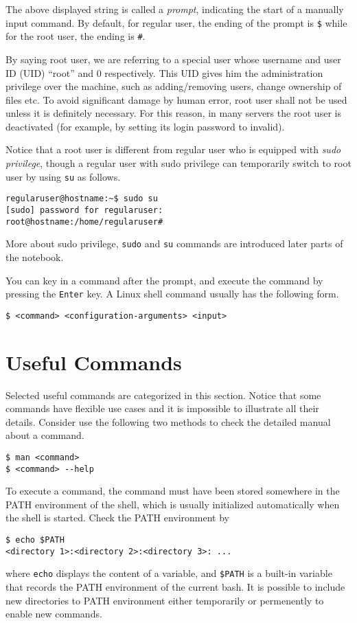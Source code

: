 The above displayed string is called a \textit{prompt}, indicating the start of a manually input command. By default, for regular user, the ending of the prompt is \verb|$| while for the root user, the ending is \verb|#|.

By saying root user, we are referring to a special user whose username and user ID (UID) ``root'' and $0$ respectively. This UID gives him the administration privilege over the machine, such as adding/removing users, change ownership of files etc. To avoid significant damage by human error, root user shall not be used unless it is definitely necessary. For this reason, in many servers the root user is deactivated (for example, by setting its login password to invalid).

Notice that a root user is different from regular user who is equipped with \textit{sudo privilege}, though a regular user with sudo privilege can temporarily switch to root user by using \verb|su| as follows.
\begin{verbatim}
regularuser@hostname:~$ sudo su
[sudo] password for regularuser:
root@hostname:/home/regularuser#
\end{verbatim}

More about sudo privilege, \verb|sudo| and \verb|su| commands are introduced later parts of the notebook.

You can key in a command after the prompt, and execute the command by pressing the \verb|Enter| key. A Linux shell command usually has the following form.
\begin{verbatim}
$ <command> <configuration-arguments> <input>
\end{verbatim}

\section{Useful Commands}

Selected useful commands are categorized in this section. Notice that some commands have flexible use cases and it is impossible to illustrate all their details. Consider use the following two methods to check the detailed manual about a command.
\begin{verbatim}
$ man <command>
$ <command> --help
\end{verbatim}

To execute a command, the command must have been stored somewhere in the PATH environment of the shell, which is usually initialized automatically when the shell is started. Check the PATH environment by
\begin{verbatim}
$ echo $PATH
<directory 1>:<directory 2>:<directory 3>: ...
\end{verbatim}
where \verb|echo| displays the content of a variable, and \verb|$PATH| is a built-in variable that records the PATH environment of the current bash. It is possible to include new directories to PATH environment either temporarily or permenently to enable new commands. 

